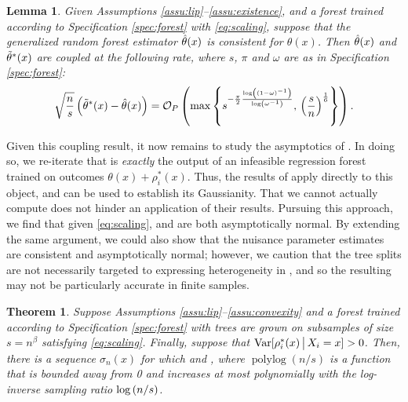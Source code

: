 \documentclass[aos]{imsart}
\theoremstyle{plain}
\newtheorem{lemm}[prop]{Lemma}
\newtheorem{theo}[prop]{Theorem}
\theoremstyle{definition}
\theoremstyle{remark}
\begin{document}
\begin{CJK}{UTF8}{gbsn}
\begin{lemm}
\label{lemm:coupling}
Given Assumptions \ref{assu:lip}--\ref{assu:existence},
and a forest trained according to Specification \ref{spec:forest} with \eqref{eq:scaling},
suppose that the generalized random forest estimator $\hat{\theta}(x)$ is
consistent for $\theta(x)$. Then $\hat{\theta}(x)$ and $\tilde{\theta}^*(x)$ are coupled
at the following rate, where $s$, $\pi$ and $\omega$ are as in Specification \ref{spec:forest}:
\begin{equation}
\label{eq:coupling}
\sqrt{\frac{n}{s}} \p{\ttheta^*(x) - \htheta(x)} = \oo_P\p{\max\cb{s^{-\frac{\pi}{2}\frac{\log\p{\p{1 - \omega}^{-1}}}{\log\p{\omega^{-1}}}}, \, \p{\frac{s}{n}}^{\frac{1}{6}}}}.
\end{equation}
\end{lemm}

Given this coupling result, it now remains to study the asymptotics of .
In doing so, we re-iterate that  is \emph{exactly} the output of an infeasible
regression forest trained on outcomes $\theta(x) + \rho_i^*(x)$. Thus, the results of
\citet{wager2015estimation} apply directly to this object, and can be used to establish
its Gaussianity. That we cannot actually compute 
does not hinder an application of their results.
Pursuing this approach, we find that given \eqref{eq:scaling},  and
 are both asymptotically normal. By extending the same
argument, we could also show that the nuisance parameter estimates  are
consistent and asymptotically normal; however, we caution that the tree splits are not necessarily
targeted to expressing heterogeneity in , and so the resulting 
may not be particularly accurate in finite samples.

\begin{theo}
\label{theo:gauss}
Suppose Assumptions \ref{assu:lip}--\ref{assu:convexity} and
a forest trained according to Specification \ref{spec:forest} with
trees are grown on subsamples of size $s = n^\beta $ satisfying \eqref{eq:scaling}.
Finally, suppose that $\operatorname{Var}[\rho_i^*(x) \,\big|\, X_i = x] > 0$. Then, there is a sequence
$\sigma_n(x)$ for which
 and
,
where $\operatorname{polylog}(n/s)$ is a function that is bounded away from 0 and
increases at most polynomially with the log-inverse sampling ratio $\log\left(n/s\right)$.
\end{theo}




\end{CJK}
\end{document}
